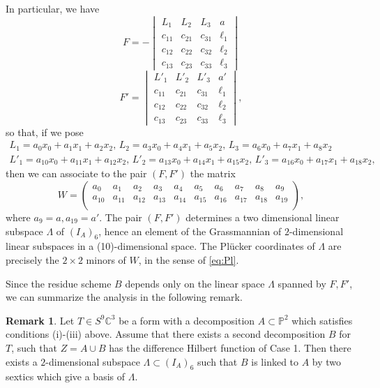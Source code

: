 \documentclass{amsart}
\newcommand{\C}{\mathbb{C}}
\newcommand{\Pj}{\mathbb{P}}
\theoremstyle{definition}
\newtheorem{rem0}[thm0]{Remark}
\begin{document}
In particular,  we have
\begin{equation}\label{eq:F1}
F = - \begin{vmatrix} L_1 & L_{2} & L_{3} & a \\ c_{11} & c_{21} & c_{31} & \ell_{1} \\ c_{12} & c_{22} & c_{32} & \ell_{2}\\ c_{13} & c_{23} & c_{33} & \ell_3  \end{vmatrix} 
\end{equation}
\begin{equation}\label{eq:F2}
F' = \begin{vmatrix} L'_1 & L'_{2} & L'_{3} & a' \\ c_{11} & c_{21} & c_{31} & \ell_{1} \\ c_{12} & c_{22} & c_{32} & \ell_{2}\\ c_{13} & c_{23} & c_{33} & \ell_3   \end{vmatrix},
\end{equation} 
so that, if we pose {\small
\begin{multline} \label{eq:lin}
L_1 = a_{0}x_{0}+a_{1}x_{1}+a_{2}x_{2}, \, L_{2} = a_{3}x_{0}+a_{4}x_{1}+a_{5}x_{2}, \, L_{3} = a_{6}x_{0}+a_{7}x_{1}+a_{8}x_{2}  \\
L'_1= a_{10}x_{0}+a_{11}x_{1}+a_{12}x_{2}, \, L'_{2} = a_{13}x_{0}+a_{14}x_{1}+a_{15}x_{2}, \, L'_{3} = a_{16}x_{0}+a_{17}x_{1}+a_{18}x_{2},
\end{multline}
}
then we can associate to the pair $ (F,F') $ the matrix
$$ W = \begin{pmatrix} a_{0} & a_{1} & a_{2} & a_{3} & a_{4} & a_{5} & a_{6} & a_{7} & a_{8} & a_{9} \\
a_{10} & a_{11} & a_{12} & a_{13} & a_{14} & a_{15} & a_{16} & a_{17} & a_{18} & a_{19} \\ \end{pmatrix},$$
where $a_9=a, a_{19}=a'$. The pair $(F, F')$ determines a two dimensional linear subspace $\Lambda$ of $(I_A)_6$, hence an element of the Grassmannian of
$2$-dimensional linear subspaces in a (10)-dimensional space. The Pl\"ucker coordinates of $\Lambda$ are precisely the $2\times 2$ minors of $W$,
in the sense of  \eqref{eq:Pl}.

Since the residue scheme $B$ depends only on the linear space $\Lambda$ spanned by $F,F'$, we can summarize the analysis in the following remark.

\begin{rem0}\label{summa} Let $T\in S^9\C^{3}$ be a form with a decomposition $A\subset \Pj^2$ which satisfies conditions (i)-(iii) above. 
Assume that there exists a second
decomposition $B$ for $T$, such that $Z=A\cup B$ has the difference Hilbert function of Case 1. Then there exists a $2$-dimensional
subspace $\Lambda\subset (I_A)_6$ such that $B$ is linked to $A$ by two sextics which give a basis of $\Lambda$.
\end{rem0}
\end{document}
